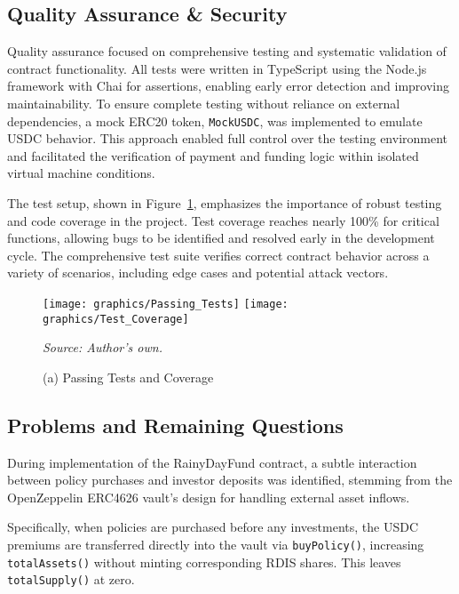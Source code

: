 \documentclass[11pt,a4paper]{article}
\begin{document}
		\subsection{Quality Assurance \& Security}\label{subsec:qa-security}
		Quality assurance focused on comprehensive testing and systematic validation of contract functionality. 
		All tests were written in TypeScript using the Node.js framework with Chai for assertions, enabling early error detection and improving maintainability. 
		To ensure complete testing without reliance on external dependencies, a mock ERC20 token, \texttt{MockUSDC}, was implemented to emulate USDC behavior. 
		This approach enabled full control over the testing environment and facilitated the verification of payment and funding logic within isolated virtual machine conditions. 

		The test setup, shown in Figure~\ref{fig:test-set-up}, emphasizes the importance of robust testing and code coverage in the project. 
		Test coverage reaches nearly 100\% for critical functions, allowing bugs to be identified and resolved early in the development cycle. 
		The comprehensive test suite verifies correct contract behavior across a variety of scenarios, including edge cases and potential attack vectors.

		\begin{figure}[!htbp]
			\centering
			\begin{minipage}[b]{0.48\textwidth}
				\centering
				\texttt{[image: graphics/Passing\_Tests]}
				\texttt{[image: graphics/Test\_Coverage]}
				\caption*{(a) Passing Tests and Coverage} \textit{Source: Author's own.}
			\end{minipage}
			\label{fig:test-set-up}
		\end{figure}

    \FloatBarrier

    \subsection{Problems and Remaining Questions}\label{subsec:problems-and-remaining-questions}

        During implementation of the RainyDayFund contract, a subtle interaction between policy purchases and investor deposits was identified, stemming from the OpenZeppelin ERC4626 vault's design for handling external asset inflows.

        Specifically, when policies are purchased before any investments, the USDC premiums are transferred directly into the vault via \texttt{buyPolicy()}, increasing \texttt{totalAssets()} without minting corresponding RDIS shares.
        This leaves \texttt{totalSupply()} at zero.
\end{document}
